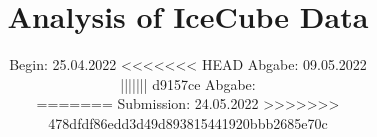 
\setlength\parindent{0pt}
\subject{Schwerpunktspraktikum Teilchenphysik und Detektoren}
\title{Analysis of IceCube Data}
\date{%
  Begin: 25.04.2022
  \hspace{3em}
<<<<<<< HEAD
  Abgabe: 09.05.2022  \\
||||||| d9157ce
  Abgabe:  \\
=======
  Submission:  24.05.2022
>>>>>>> 478dfdf86edd3d49d893815441920bbb2685e70c
}



\maketitle
\thispagestyle{empty}
\tableofcontents
\newpage








\newpage
\nocite{*}
\printbibliography
\appendix


